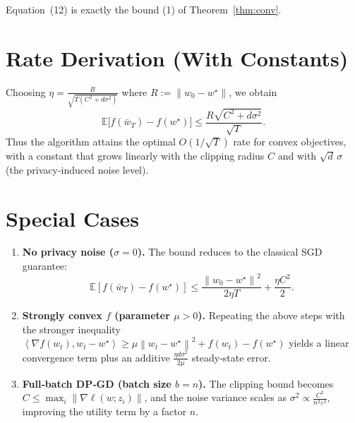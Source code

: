 \documentclass{article}
\newcommand{\E}{\mathbb{E}}
\newcommand{\norm}[1]{\left\|#1\right\|}
\newcommand{\ip}[2]{\left\langle #1,#2\right\rangle}
\newcommand{\grad}{\nabla}
\begin{document}
Equation~(12) is exactly the bound (1) of Theorem~\ref{thm:conv}. \hfill\qedsymbol

\section*{Rate Derivation (With Constants)}
Choosing $\eta = \frac{R}{\sqrt{T(C^{2}+d\sigma^{2})}}$ where $R:=\norm{w_0-w^{\star}}$, we obtain
\[
\E\!\bigl[f(\bar w_T)-f(w^{\star})\bigr]
 \le \frac{R\sqrt{C^{2}+d\sigma^{2}}}{\sqrt{T}}.
\]
Thus the algorithm attains the optimal $O(1/\sqrt{T})$ rate for convex objectives, with a constant that grows linearly with the clipping radius $C$ and with $\sqrt{d}\,\sigma$ (the privacy‑induced noise level).

\section*{Special Cases}
\begin{enumerate}[leftmargin=*]
\item \textbf{No privacy noise ($\sigma=0$).} The bound reduces to the classical SGD guarantee:
\[
\E[f(\bar w_T)-f(w^{\star})]\le\frac{\norm{w_0-w^{\star}}^{2}}{2\eta T}+\frac{\eta C^{2}}{2}.
\]
\item \textbf{Strongly convex $f$ (parameter $\mu>0$).} Repeating the above steps with the stronger inequality
$\ip{\grad f(w_t)}{w_t-w^{\star}}\ge \mu \norm{w_t-w^{\star}}^{2}+f(w_t)-f(w^{\star})$
yields a linear convergence term plus an additive $\frac{\eta d\sigma^{2}}{2\mu}$ steady‑state error.
\item \textbf{Full‑batch DP‑GD (batch size $b=n$).} The clipping bound becomes $C\le \max_i\norm{\grad\ell(w;z_i)}$, and the noise variance scales as $\sigma^{2}\propto \frac{C^{2}}{n^{2}\varepsilon^{2}}$, improving the utility term by a factor $n$.
\end{enumerate}
\end{document}
